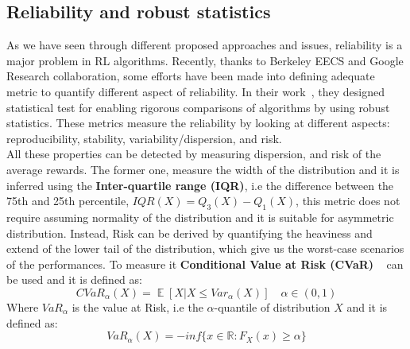 \documentclass{article}
\DeclareMathOperator{\EX}{\mathbb{E}}%
\begin{document}
\subsection{Reliability and robust statistics}
As we have seen through different proposed approaches and issues, reliability is a major problem in RL algorithms. Recently, thanks to  Berkeley EECS and Google Research collaboration, some efforts have been made into defining adequate metric to quantify different aspect of reliability. In their work~\cite{GoogleMeasure}, they designed statistical test for enabling rigorous comparisons of algorithms by using robust statistics. These metrics measure the reliability by looking at different aspects: reproducibility, stability, variability/dispersion, and risk.\\
All these properties can be detected by measuring dispersion, and risk of the average rewards. The former one, measure the width of the distribution and it is inferred using the \textbf{Inter-quartile range (IQR)}, i.e the difference between the 75th and 25th percentile, $ IQR(X) = Q_3(X) - Q_1(X)$, this metric does not require assuming normality of the distribution and it is suitable for asymmetric distribution.
Instead, Risk can be derived by quantifying the heaviness and extend of the lower tail of the distribution, which give us the worst-case scenarios of the performances. To measure it \textbf{Conditional Value at Risk (CVaR)} ~\cite{Cvar} can be used and it is defined as:
\begin{equation}
CVaR_\alpha(X) = \EX \left[ X \vert X \leq Var_\alpha(X) \right]  \quad \alpha \in (0,1)
\end{equation}
Where $VaR_\alpha$ is the value at Risk, i.e the $\alpha$-quantile of distribution $X$ and it is defined as:
\begin{equation}
VaR_\alpha(X) = -inf \{ x \in \mathbb{R}: F_X(x) \ge \alpha \}
\end{equation}
\end{document}
